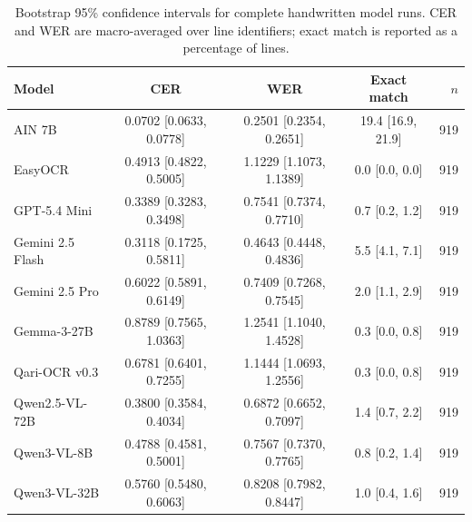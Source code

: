 \begin{table}[t]
\centering
\caption{Bootstrap 95\% confidence intervals for complete handwritten model runs. CER and WER are macro-averaged over line identifiers; exact match is reported as a percentage of lines.}
\label{tab:app_ci_handwritten_macro}
\small
\setlength{\tabcolsep}{3.5pt}
\begin{tabular}{lcccr}
\toprule
Model & CER & WER & Exact match & $n$ \\
\midrule
AIN 7B & 0.0702 [0.0633, 0.0778] & 0.2501 [0.2354, 0.2651] & 19.4 [16.9, 21.9] & 919 \\
EasyOCR & 0.4913 [0.4822, 0.5005] & 1.1229 [1.1073, 1.1389] & 0.0 [0.0, 0.0] & 919 \\
GPT-5.4 Mini & 0.3389 [0.3283, 0.3498] & 0.7541 [0.7374, 0.7710] & 0.7 [0.2, 1.2] & 919 \\
Gemini 2.5 Flash & 0.3118 [0.1725, 0.5811] & 0.4643 [0.4448, 0.4836] & 5.5 [4.1, 7.1] & 919 \\
Gemini 2.5 Pro & 0.6022 [0.5891, 0.6149] & 0.7409 [0.7268, 0.7545] & 2.0 [1.1, 2.9] & 919 \\
Gemma-3-27B & 0.8789 [0.7565, 1.0363] & 1.2541 [1.1040, 1.4528] & 0.3 [0.0, 0.8] & 919 \\
Qari-OCR v0.3 & 0.6781 [0.6401, 0.7255] & 1.1444 [1.0693, 1.2556] & 0.3 [0.0, 0.8] & 919 \\
Qwen2.5-VL-72B & 0.3800 [0.3584, 0.4034] & 0.6872 [0.6652, 0.7097] & 1.4 [0.7, 2.2] & 919 \\
Qwen3-VL-8B & 0.4788 [0.4581, 0.5001] & 0.7567 [0.7370, 0.7765] & 0.8 [0.2, 1.4] & 919 \\
Qwen3-VL-32B & 0.5760 [0.5480, 0.6063] & 0.8208 [0.7982, 0.8447] & 1.0 [0.4, 1.6] & 919 \\
\bottomrule
\end{tabular}
\end{table}

